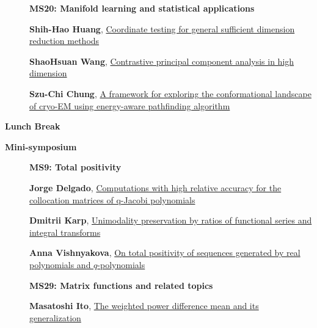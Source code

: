 \documentclass[ILAS2025-program.tex]{subfiles}
\begin{document}
\begin{description}
\begin{description}
{}
        \end{description}
    \begin{description}
    \item[] {\color{mstitle}\textbf{MS20: Manifold learning and statistical applications}} 
    \item[] \hypertarget{up0040}{}\textbf{Shih-Hao Huang}, \hyperlink{down0040}{Coordinate testing for general sufficient dimension reduction methods}
        \item[] \hypertarget{up0041}{}\textbf{ShaoHsuan Wang}, \hyperlink{down0041}{Contrastive principal component analysis in high dimension}
        \item[] \hypertarget{up0042}{}\textbf{Szu-Chi Chung}, \hyperlink{down0042}{A framework for exploring the conformational landscape of cryo-EM using energy-aware pathfinding algorithm}
        \end{description}
    \item[\info{12:30\textrm{--}14:00}] \textbf{Lunch Break} \info{}
    \item[\info{14:00\textrm{--}15:30}] \textbf{Mini-symposium} 
    \begin{description}
    \item[] {\color{mstitle}\textbf{MS9: Total positivity}} 
    \item[] \hypertarget{up0043}{}\textbf{Jorge Delgado}, \hyperlink{down0043}{Computations with high relative accuracy for the collocation matrices of q-Jacobi polynomials}
        \item[] \hypertarget{up0044}{}\textbf{Dmitrii Karp}, \hyperlink{down0044}{Unimodality preservation by ratios of functional series and integral transforms}
        \item[] \hypertarget{up0045}{}\textbf{Anna Vishnyakova}, \hyperlink{down0045}{On total positivity of sequences generated by 
real polynomials and $q$-polynomials
}
        \end{description}
    \begin{description}
    \item[] {\color{mstitle}\textbf{MS29: Matrix functions and related topics}} 
    \item[] \hypertarget{up0046}{}\textbf{Masatoshi Ito}, \hyperlink{down0046}{The weighted power difference mean and its generalization}

\end{description}
\end{description}
\end{document}
